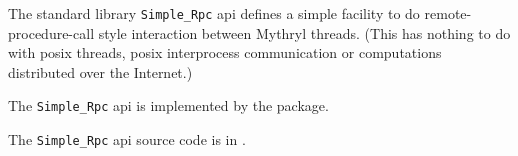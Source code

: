 
The standard library {\tt Simple\_Rpc} api defines 
a simple facility to 
do remote-procedure-call style interaction between Mythryl threads. (This 
has nothing to do with posix threads, posix interprocess communication 
or computations distributed over the Internet.)

The {\tt Simple\_Rpc} api is implemented by the  package.

The {\tt Simple\_Rpc} api source code is in .








